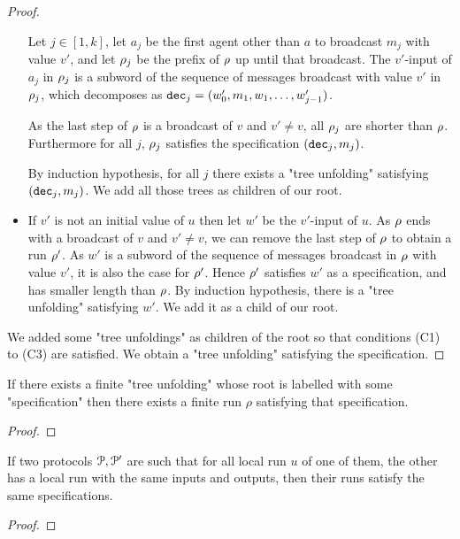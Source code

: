 \begin{proof}
\begin{itemize}
		Let $j \in [1,k]$, let $a_j$ be the first agent other than $a$ to broadcast $m_j$ with value $v'$, and let $\rho_j$ be the prefix of $\rho$ up until that broadcast. The $v'$-input of $a_j$ in $\rho_j$ is a subword of the sequence of messages broadcast with value $v'$ in $\rho_j$, which decomposes as $\mathtt{dec}_j = (w'_0, m_1, w_1, \ldots, w'_{j-1})$.
		
		As the last step of $\rho$ is a broadcast of $v$ and $v' \neq v$, all $\rho_j$ are shorter than $\rho$. Furthermore for all $j$, $\rho_j$ satisfies the specification $(\mathtt{dec}_j, m_j)$.		
		
		By induction hypothesis, for all $j$ there exists a "tree unfolding" satisfying $(\mathtt{dec}_j, m_j)$. We add all those trees as children of our root.
		
		\item If $v'$ is not an initial value of $u$ then let $w'$ be the $v'$-input of $u$. 
		 As $\rho$ ends with a broadcast of $v$ and $v' \neq v$, we can remove the last step of $\rho$ to obtain a run $\rho'$. As $w'$ is a subword of the sequence of messages broadcast in $\rho$ with value $v'$, it is also the case for $\rho'$.
		 Hence $\rho'$ satisfies $w'$ as a specification, and has smaller length than $\rho$. By induction hypothesis, there is a "tree unfolding" satisfying $w'$. We add it as a child of our root.
	\end{itemize}
	
	We added some "tree unfoldings" as children of the root so that conditions (C1) to (C3) are satisfied. We obtain a "tree unfolding" satisfying the specification.
\end{proof}

\begin{lemma}
	If there exists a finite "tree unfolding" whose root is labelled with some "specification" then there exists  a finite run $\rho$ satisfying that specification.
\end{lemma}

\begin{proof}
\end{proof}

\begin{lemma}
	If two protocols $\mathcal{P}, \mathcal{P}'$ are such that for all local run $u$ of one of them, the other has a local run with the same inputs and outputs, then their runs satisfy the same specifications. 
\end{lemma}

\begin{proof}
\end{proof}



